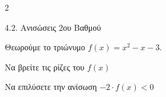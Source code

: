 \begin{ylh}{2}
    \item 4.2. Ανισώσεις 2ου Βαθμού
\end{ylh}
Θεωρούμε το τριώνυμο $f(x) = x^{2} - x - 3$.
\begin{alist}
\item Να βρείτε τις ρίζες του $f(x)$ 
\item Να επιλύσετε την ανίσωση $- 2 \cdot f(x) < 0$ 
\end{alist}

